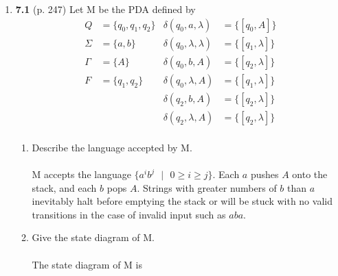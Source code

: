 \documentclass[12pt]{article}
\begin{document}
\begin{enumerate}
\item \textbf{7.1} (p. 247) Let M be the PDA defined by
  \begin{align*}
    Q &= \{q_0,q_1,q_2\} &\delta(q_0,a,\lambda) &= \{[q_0,A]\} \\
    \Sigma &= \{a,b\} &\delta(q_0,\lambda,\lambda) &= \{[q_1,\lambda]\} \\
    \Gamma &= \{A\} &\delta(q_0,b,A) &= \{[q_2,\lambda]\} \\
    F &= \{q_1,q_2\} &\delta(q_0,\lambda,A) &= \{[q_1,\lambda]\} \\
      & &\delta(q_2,b,A) &= \{[q_2,\lambda]\} \\
      & &\delta(q_2,\lambda,A) &= \{[q_2,\lambda]\} \\
  \end{align*}
  \begin{enumerate}
  \item Describe the language accepted by M. \\ \\
    M accepts the language $\{a^ib^j\text{ }|\text{ }0 \ge i \ge 
    j\}$. Each $a$ pushes $A$ onto the stack, and each $b$ pops
    $A$. Strings with greater numbers of $b$ than $a$ inevitably halt
    before emptying the stack or will be stuck with no valid transitions in
    the case of invalid input such as $aba$. 
  \item Give the state diagram of M. \\ \\
    The state diagram of M is
    \begin{center}
\end{center}
\end{enumerate}
\end{enumerate}
\end{document}
